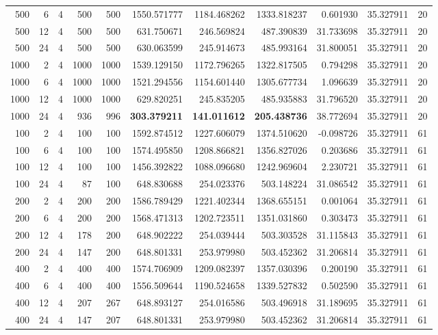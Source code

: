 \begin{table}
\begin{tabular}{rrrrrrrrrrr}
500 & 6 & 4 & 500 & 500 & 1550.571777 & 1184.468262 & 1333.818237 & 0.601930 & 35.327911 & 20 \\
500 & 12 & 4 & 500 & 500 & 631.750671 & 246.569824 & 487.390839 & 31.733698 & 35.327911 & 20 \\
500 & 24 & 4 & 500 & 500 & 630.063599 & 245.914673 & 485.993164 & 31.800051 & 35.327911 & 20 \\
1000 & 2 & 4 & 1000 & 1000 & 1539.129150 & 1172.796265 & 1322.817505 & 0.794298 & 35.327911 & 20 \\
1000 & 6 & 4 & 1000 & 1000 & 1521.294556 & 1154.601440 & 1305.677734 & 1.096639 & 35.327911 & 20 \\
1000 & 12 & 4 & 1000 & 1000 & 629.820251 & 245.835205 & 485.935883 & 31.796520 & 35.327911 & 20 \\
1000 & 24 & 4 & 936 & 996 & \textbf{303.379211} & \textbf{141.011612} & \textbf{205.438736} & 38.772694 & 35.327911 & 20 \\
100 & 2 & 4 & 100 & 100 & 1592.874512 & 1227.606079 & 1374.510620 & -0.098726 & 35.327911 & 61 \\
100 & 6 & 4 & 100 & 100 & 1574.495850 & 1208.866821 & 1356.827026 & 0.203686 & 35.327911 & 61 \\
100 & 12 & 4 & 100 & 100 & 1456.392822 & 1088.096680 & 1242.969604 & 2.230721 & 35.327911 & 61 \\
100 & 24 & 4 & 87 & 100 & 648.830688 & 254.023376 & 503.148224 & 31.086542 & 35.327911 & 61 \\
200 & 2 & 4 & 200 & 200 & 1586.789429 & 1221.402344 & 1368.655151 & 0.001064 & 35.327911 & 61 \\
200 & 6 & 4 & 200 & 200 & 1568.471313 & 1202.723511 & 1351.031860 & 0.303473 & 35.327911 & 61 \\
200 & 12 & 4 & 178 & 200 & 648.902222 & 254.039444 & 503.303528 & 31.115843 & 35.327911 & 61 \\
200 & 24 & 4 & 147 & 200 & 648.801331 & 253.979980 & 503.452362 & 31.206814 & 35.327911 & 61 \\
400 & 2 & 4 & 400 & 400 & 1574.706909 & 1209.082397 & 1357.030396 & 0.200190 & 35.327911 & 61 \\
400 & 6 & 4 & 400 & 400 & 1556.509644 & 1190.524658 & 1339.527832 & 0.502590 & 35.327911 & 61 \\
400 & 12 & 4 & 207 & 267 & 648.893127 & 254.016586 & 503.496918 & 31.189695 & 35.327911 & 61 \\
400 & 24 & 4 & 147 & 207 & 648.801331 & 253.979980 & 503.452362 & 31.206814 & 35.327911 & 61 \\

\end{tabular}
\end{table}
